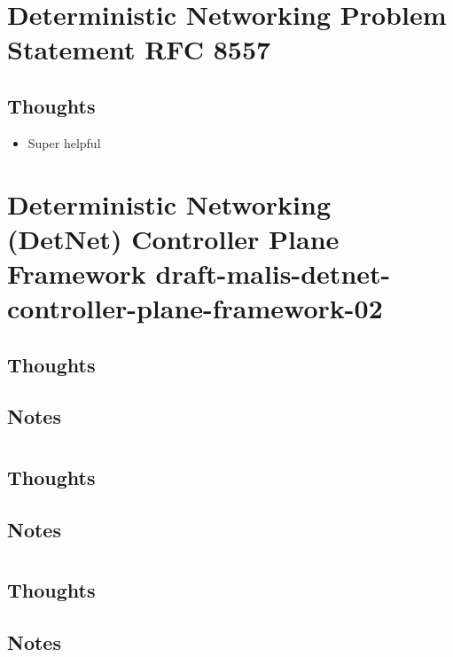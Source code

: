 \documentclass{article}
\begin{document}
\section{Deterministic Networking Problem Statement RFC 8557}

\subsection{Thoughts}
\begin{itemize}
    \item Super helpful
\end{itemize}

\section{Deterministic Networking (DetNet) Controller Plane Framework draft-malis-detnet-controller-plane-framework-02}

\subsection{Thoughts}
\begin{itemize}
\end{itemize}

\subsection{Notes}
\begin{itemize}
\end{itemize}

\section{}

\subsection{Thoughts}
\begin{itemize}
\end{itemize}

\subsection{Notes}
\begin{itemize}
\end{itemize}

\section{}

\subsection{Thoughts}
\begin{itemize}
\end{itemize}

\subsection{Notes}
\begin{itemize}
\end{itemize}
\end{document}
